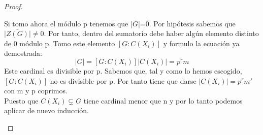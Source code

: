 \documentclass{apuntes}
\begin{document}
\begin{proof}
\begin{itemize}
  Si tomo ahora el módulo p tenemos que |$\bar{G}$|=$\bar{0}$. Por hipótesis sabemos que $\bar{|Z(G)|} \neq 0$. Por tanto, dentro del 
  sumatorio debe haber algún elemento distinto de 0 módulo p. Tomo este elemento $[G:C(X_i)]$  y formulo la ecuación ya
  demostrada:\\
  \[|G|=[G:C(X_i)]|C(X_i)|=p^{r}m\] Este cardinal es divisible por p. 
  Sabemos que, tal y como lo hemos escogido, $[G:C(X_i)]$  no es divisible por p. Por tanto tiene que darse $|C(X_i)|=p^{r}m'$  con m y p coprimos.\\
  Puesto que $C(X_i) \varsubsetneq G$  tiene cardinal menor que n y por lo tanto podemos aplicar de nuevo inducción.
 \end{itemize}

\end{proof}
\end{document}

